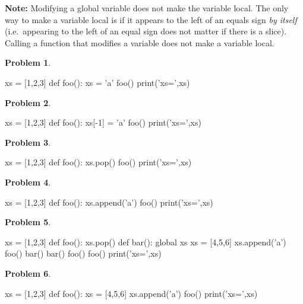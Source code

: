 \documentclass[12pt]{article}
\theoremstyle{definition}
\newtheorem{problem}{Problem}
\begin{document}
\newpage
\noindent
\textbf{Note:}
Modifying a global variable does not make the variable local.
The only way to make a variable local is if it appears to the left of an equals sign \emph{by itself}
(i.e.\ appearing to the left of an equal sign does not matter if there is a slice).
Calling a function that modifies a variable does not make a variable local.

\begin{problem}
~~~
\begin{python}
xs = [1,2,3]
def foo():
    xs = 'a'
foo()
print('xs=',xs)
\end{python}
\end{problem}
\vspace{1in}

\begin{problem}
~~~
\begin{python}
xs = [1,2,3]
def foo():
    xs[-1] = 'a'
foo()
print('xs=',xs)
\end{python}
\end{problem}
\vspace{1.5in}

\begin{problem}
~~~
\begin{python}
xs = [1,2,3]
def foo():
    xs.pop()
foo()
print('xs=',xs)
\end{python}
\end{problem}
\vspace{1.5in}

\newpage

\begin{problem}
~~~
\begin{python}
xs = [1,2,3]
def foo():
    xs.append('a')
foo()
print('xs=',xs)
\end{python}
\end{problem}
\vspace{1.5in}

\begin{problem}
~~~
\begin{python}
xs = [1,2,3]
def foo():
    xs.pop()
def bar():
    global xs
    xs = [4,5,6]
    xs.append('a')
foo()
bar()
bar()
foo()
foo()
print('xs=',xs)
\end{python}
\end{problem}
\vspace{1.5in}


\newpage
\begin{problem}
~~~
\begin{python}
xs = [1,2,3]
def foo():
    xs = [4,5,6]
    xs.append('a')
foo()
print('xs=',xs)
\end{python}
\end{problem}
\vspace{1in}
\end{document}
